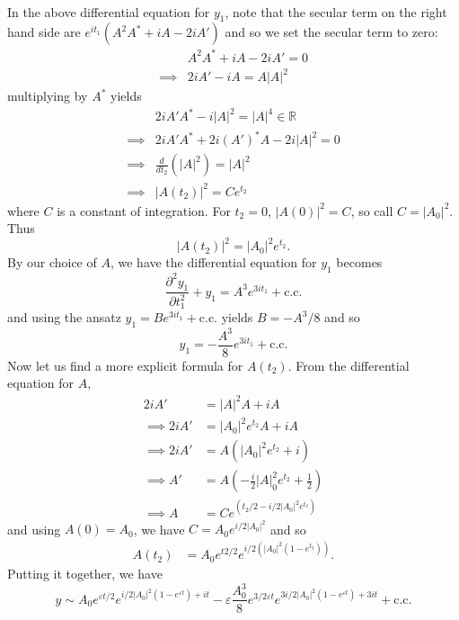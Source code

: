 \documentclass{article}
\begin{document}
\begin{itemize}
\begin{align*}
    \end{align*}
    In the above differential equation for $y_1$, note that the secular term on the right hand side are $e^{it_1}(A^2A^* + iA - 2iA')$ and so we set the secular term to zero:
    \begin{align*}
        &A^2A^* + iA - 2iA' = 0\\
        \implies &2iA' - iA= A|A|^2
    \end{align*}
    multiplying by $A^*$ yields
    \begin{align*}
        &2iA'A^* - i|A|^2 = |A|^4 \in \mathbb{R}\\
        \implies &2iA'A^* + 2i(A')^*A - 2i|A|^2 = 0\\
        \implies &\frac{d}{dt_2}\left(|A|^2\right) = |A|^2\\
        \implies &|A(t_2)|^2 = Ce^{t_2}
    \end{align*}
    where $C$ is a constant of integration. For $t_2 = 0$, $|A(0)|^2 = C$, so call $C = |A_0|^2$. Thus
    \[|A(t_2)|^2 = |A_0|^2e^{t_2}.\]
    By our choice of $A$, we have the differential equation for $y_1$ becomes
    \[\frac{\partial^2y_1}{\partial t_1^2} + y_1 = A^3e^{3it_1} + \text{c.c.}\]
    and using the ansatz $y_1 = Be^{3it_1} + \text{c.c.}$ yields $B = -A^3/8$ and so
    \[y_1 = -\frac{A^3}{8}e^{3it_1} + \text{c.c.}\]
    Now let us find a more explicit formula for $A(t_2)$. From the differential equation for $A$,
    \begin{align*}
        2iA' &= |A|^2A + iA\\
        \implies 2iA' &= |A_0|^2e^{t_2}A + iA\\
        \implies 2iA' &= A\left(|A_0|^2e^{t_2} + i\right)\\
        \implies A' &= A\left(-\frac{i}{2}|A|_0^2e^{t_2} + \frac{1}{2}\right)\\
        \implies A &= Ce^{\left(t_2/2 - i/2|A_0|^2e^{t_2}\right)}
    \end{align*}
    and using $A(0) = A_0$, we have $C = A_0e^{i/2|A_0|^2}$ and so
    \begin{align*}
        A(t_2) &= A_0e^{t2/2}e^{i/2\left(|A_0|^2(1 - e^{t_2})\right)}.
    \end{align*}
    Putting it together, we have
    \[y \sim A_0e^{\varepsilon t/2}e^{i/2|A_0|^2(1 - e^{\varepsilon t}) + it} - \varepsilon \frac{A_0^3}{8}e^{3/2\varepsilon t}e^{3i/2|A_0|^2(1 - e^{\varepsilon t}) + 3it} + \text{c.c.}\]
\end{itemize}
\end{document}
